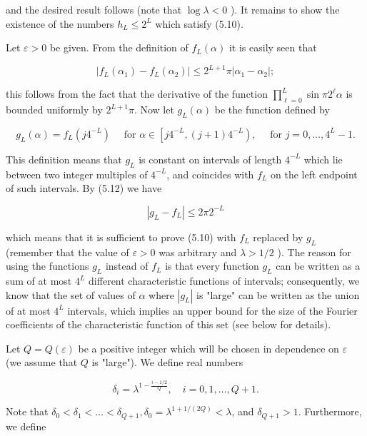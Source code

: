\documentclass[10pt]{article}
\begin{document}
and the desired result follows (note that $\log \lambda<0$ ). It remains to show the existence of the numbers $h_{L} \leqslant 2^{L}$ which satisfy (5.10).

Let $\varepsilon>0$ be given. From the definition of $f_{L}(\alpha)$ it is easily seen that


\begin{equation*}
\left|f_{L}\left(\alpha_{1}\right)-f_{L}\left(\alpha_{2}\right)\right| \leqslant 2^{L+1} \pi\left|\alpha_{1}-\alpha_{2}\right| ; \tag{5.12}
\end{equation*}


this follows from the fact that the derivative of the function $\prod_{\ell=0}^{L} \sin \pi 2^{\ell} \alpha$ is bounded uniformly by $2^{L+1} \pi$. Now let $g_{L}(\alpha)$ be the function defined by

$$
g_{L}(\alpha)=f_{L}\left(j 4^{-L}\right) \quad \text { for } \alpha \in\left[j 4^{-L},(j+1) 4^{-L}\right), \quad \text { for } j=0, \ldots, 4^{L}-1 .
$$

This definition means that $g_{L}$ is constant on intervals of length $4^{-L}$ which lie between two integer multiples of $4^{-L}$, and coincides with $f_{L}$ on the left endpoint of such intervals. By (5.12) we have


\begin{equation*}
\left|g_{L}-f_{L}\right| \leqslant 2 \pi 2^{-L} \tag{5.13}
\end{equation*}


which means that it is sufficient to prove (5.10) with $f_{L}$ replaced by $g_{L}$ (remember that the value of $\varepsilon>0$ was arbitrary and $\lambda>1 / 2$ ). The reason for using the functions $g_{L}$ instead of $f_{L}$ is that every function $g_{L}$ can be written as a sum of at most $4^{L}$ different characteristic functions of intervals; consequently, we know that the set of values of $\alpha$ where $\left|g_{L}\right|$ is "large" can be written as the union of at most $4^{L}$ intervals, which implies an upper bound for the size of the Fourier coefficients of the characteristic function of this set (see below for details).

Let $Q=Q(\varepsilon)$ be a positive integer which will be chosen in dependence on $\varepsilon$ (we assume that $Q$ is "large"). We define real numbers

$$
\delta_{i}=\lambda^{1-\frac{i-1 / 2}{Q}}, \quad i=0,1, \ldots, Q+1 .
$$

Note that $\delta_{0}<\delta_{1}<\ldots<\delta_{Q+1}, \delta_{0}=\lambda^{1+1 /(2 Q)}<\lambda$, and $\delta_{Q+1}>1$. Furthermore, we define
\end{document}
